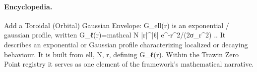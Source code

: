 \paragraph{Encyclopedia.}
Add a Toroidal (Orbital) Gaussian Envelope: G\_ell(r) is an exponential / gaussian profile, written G\_ℓ(r)=mathcal N |r|\textasciicircum{}|ℓ| e\textasciicircum{}-r\textasciicircum{}2/(2σ\_r\textasciicircum{}2) .. It describes an exponential or Gaussian profile characterizing localized or decaying behaviour. It is built from ell, N, r, defining G\_ℓ(r). Within the Trawin Zero Point registry it serves as one element of the framework's mathematical narrative.
